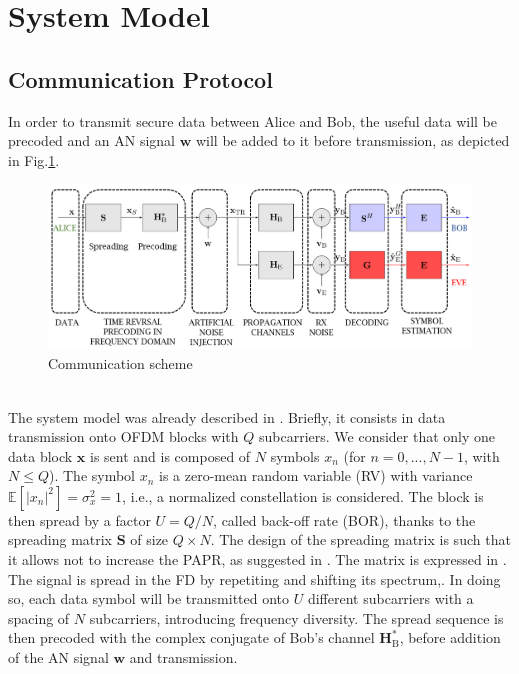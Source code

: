 \documentclass[journal,comsoc]{IEEEtran}
\let\MYoriglatexcaption\caption
\renewcommand{\caption}[2][\relax]{\MYoriglatexcaption[#2]{#2}}
\newcommand{\EX}[1]{\mathbb{E} \left[#1\right]}%
\newcommand{\HB}{\textbf{H}_{\text{B}}}
\newcommand{\spread}{\textbf{S}}
\newcommand{\w}{\textbf{w}}
\begin{document}
\section{System Model}\label{sec:system-model}


\subsection{Communication Protocol}
In order to transmit secure data between Alice and Bob, the useful data will be precoded and an AN signal $\w$ will be added to it before transmission, as depicted in Fig.\ref{fig_com_scheme}.  
\begin{figure}[h!t]
	\centering
	\includegraphics[width=1\linewidth]{graphs/com_scheme_an.PNG}
	\caption{Communication scheme}
	\label{fig_com_scheme}
\end{figure}\\
The system model was already described in \cite{9049811}. Briefly, it consists in data transmission onto OFDM blocks with $Q$ subcarriers. We consider that only one data block $\textbf{x}$ is sent and is composed of $N$ symbols $x_n$ (for $n = 0,..., N-1$, with $N\leq Q$). The symbol $x_n$ is  a zero-mean random variable (RV) with variance $\EX{|x_n|^2} = \sigma_x^2 = 1$, i.e., a normalized constellation is considered. The block is then spread by a factor $U = Q/N$, called back-off rate (BOR), thanks to the spreading matrix $\spread$ of size $Q\times N$. The design of the spreading matrix is such that it allows not to increase the PAPR, as suggested in \cite{4394231}. The matrix is expressed in \cite{9049811}. The signal is spread in the FD by repetiting and shifting its spectrum,\cite{8883213}. In doing so, each data symbol will be transmitted onto $U$ different subcarriers with a spacing of $N$ subcarriers, introducing frequency diversity. The spread sequence is then precoded with the complex conjugate of Bob's channel $\HB^*$, before addition of the AN signal $\textbf{w}$  and transmission. 
\end{document}
